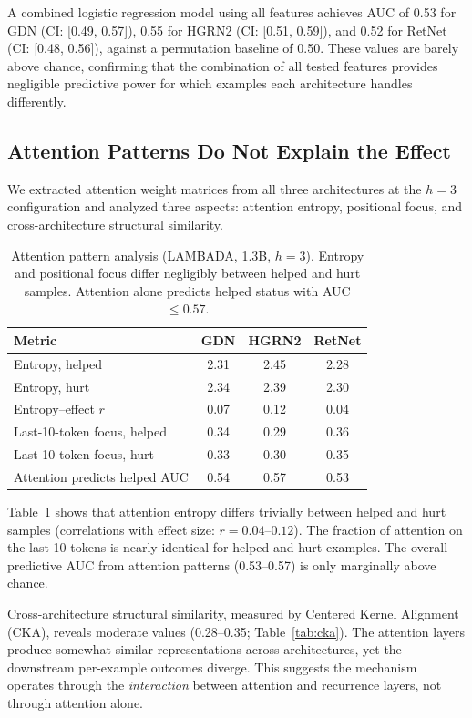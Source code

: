\documentclass[11pt]{article}
\begin{document}
A combined logistic regression model using all features achieves AUC of 0.53 for GDN (CI: [0.49, 0.57]), 0.55 for HGRN2 (CI: [0.51, 0.59]), and 0.52 for RetNet (CI: [0.48, 0.56]), against a permutation baseline of 0.50. These values are barely above chance, confirming that the combination of all tested features provides negligible predictive power for which examples each architecture handles differently.

\subsection{Attention Patterns Do Not Explain the Effect}
\label{sec:attention}

We extracted attention weight matrices from all three architectures at the $h=3$ configuration and analyzed three aspects: attention entropy, positional focus, and cross-architecture structural similarity.

\begin{table}[t]
\centering
\caption{Attention pattern analysis (LAMBADA, 1.3B, $h=3$). Entropy and positional focus differ negligibly between helped and hurt samples. Attention alone predicts helped status with AUC $\leq 0.57$.}
\label{tab:attention}
\begin{tabular}{lccc}
\toprule
Metric & GDN & HGRN2 & RetNet \\
\midrule
Entropy, helped & 2.31 & 2.45 & 2.28 \\
Entropy, hurt & 2.34 & 2.39 & 2.30 \\
Entropy--effect $r$ & 0.07 & 0.12 & 0.04 \\
Last-10-token focus, helped & 0.34 & 0.29 & 0.36 \\
Last-10-token focus, hurt & 0.33 & 0.30 & 0.35 \\
Attention predicts helped AUC & 0.54 & 0.57 & 0.53 \\
\bottomrule
\end{tabular}
\end{table}

Table~\ref{tab:attention} shows that attention entropy differs trivially between helped and hurt samples (correlations with effect size: $r = 0.04$--$0.12$). The fraction of attention on the last 10 tokens is nearly identical for helped and hurt examples. The overall predictive AUC from attention patterns (0.53--0.57) is only marginally above chance.

Cross-architecture structural similarity, measured by Centered Kernel Alignment (CKA), reveals moderate values (0.28--0.35; Table~\ref{tab:cka}). The attention layers produce somewhat similar representations across architectures, yet the downstream per-example outcomes diverge. This suggests the mechanism operates through the \emph{interaction} between attention and recurrence layers, not through attention alone.
\end{document}

